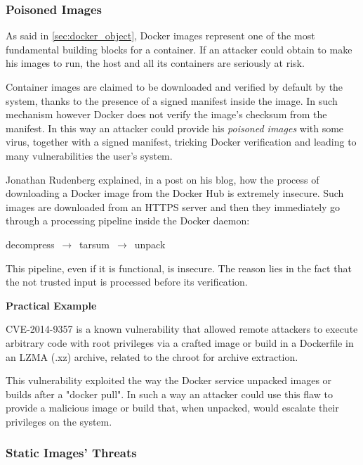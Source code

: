 \documentclass[a4paper,12pt]{article}
\begin{document}
\subsubsection{Poisoned Images}

As said in \ref{sec:docker_object}, Docker images represent one of the most
fundamental building blocks for a container. If an attacker could obtain to make
his images to run, the host and all its containers are seriously at risk. \par
Container images are claimed to be downloaded and verified by default by the
system, thanks to the presence of a signed manifest inside the image. In such
mechanism however Docker does not verify the image's checksum from the manifest.
In this way an attacker could provide his \textit{poisoned images} with some virus,
together with a signed manifest, tricking Docker verification and leading to
many vulnerabilities the user's system. \par Jonathan Rudenberg explained, in a
post\cite{docker_image_insecurity} on his blog, how the process of downloading a
Docker image from the Docker Hub is extremely insecure. Such images are
downloaded from an HTTPS server and then they immediately go through a
processing pipeline inside the Docker daemon: \bigbreak\centerline{decompress
$\,\to\,$ tarsum $\,\to\,$ unpack}\bigbreak This pipeline, even if it is
functional, is insecure. The reason lies in the fact that the not trusted input
is processed before its verification. 

\bigbreak\textbf{Practical Example}\bigbreak 

CVE-2014-9357\cite{CVE-2014-9357} is a known vulnerability that allowed remote
attackers to execute arbitrary code with root privileges via a crafted image or
build in a Dockerfile in an LZMA (.xz) archive, related to the chroot for
archive extraction.\par This vulnerability exploited the way the Docker service
unpacked images or builds after a "docker pull". In such a way an attacker could
use this flaw to provide a malicious image or build that, when unpacked, would
escalate their privileges on the system.

\subsubsection{Static Images' Threats}
\end{document}
